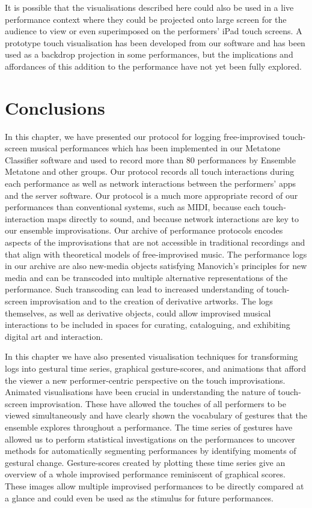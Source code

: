 \documentclass[graybox]{svmult}
\begin{document}
It is possible that the visualisations described here could also be used in a live
performance context where they could be projected onto large screen for the audience to
view or even superimposed on the performers' iPad touch screens. A
prototype touch visualisation has been developed from our software and
has been used as a backdrop projection in some performances, but the
implications and affordances of this addition to the performance have
not yet been fully explored.

\section{Conclusions}

In this chapter, we have presented our protocol for logging
free-improvised touch-screen musical performances which has been
implemented in our Metatone Classifier software and used to record
more than 80 performances by Ensemble Metatone and other groups. Our
protocol records all touch interactions during each performance as
well as network interactions between the performers' apps and the
server software. Our protocol is a much more appropriate record of our
performances than conventional systems, such as MIDI, because each
touch-interaction maps directly to sound, and because network
interactions are key to our ensemble improvisations. Our archive of
performance protocols encodes aspects of the improvisations that are
not accessible in traditional recordings and that align with
theoretical models of free-improvised music. The performance logs in
our archive are also new-media objects satisfying Manovich's principles
for new media and can be transcoded into multiple alternative
representations of the performance. Such transcoding can lead to
increased understanding of touch-screen improvisation and to the
creation of derivative artworks.
The logs themselves, as well as derivative objects, could allow
improvised musical interactions to be included in spaces for curating,
cataloguing, and exhibiting digital art and interaction.


In this chapter we have also presented visualisation techniques for
transforming logs into gestural time series, graphical gesture-scores,
and animations that afford the viewer a new performer-centric
perspective on the touch improvisations. Animated visualisations have
been crucial in understanding the nature of touch-screen
improvisation. These have allowed the touches of all performers to be
viewed simultaneously and have clearly shown the vocabulary of
gestures that the ensemble explores throughout a performance. The time
series of gestures have allowed us to perform statistical
investigations on the performances to uncover methods for
automatically segmenting performances by identifying moments of
gestural change. Gesture-scores created by plotting these time series
give an overview of a whole improvised performance reminiscent of
graphical scores. These images allow multiple improvised performances
to be directly compared at a glance and could even be used as the
stimulus for future performances.
\end{document}
